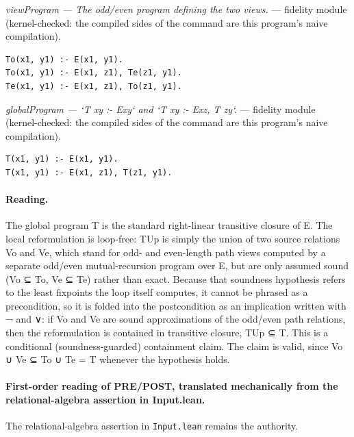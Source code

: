 \documentclass[10pt]{article}
\begin{document}
{\raggedright\textit{viewProgram --- The odd/even program defining the two views.} --- fidelity module (kernel-checked: the compiled sides of the command are this program's naive compilation).\par}

\begin{Verbatim}[fontsize=\scriptsize,breaklines=true,breakanywhere=true,frame=single,framesep=1.5mm]
To(x1, y1) :- E(x1, y1).
To(x1, y1) :- E(x1, z1), Te(z1, y1).
Te(x1, y1) :- E(x1, z1), To(z1, y1).
\end{Verbatim}

{\raggedright\textit{globalProgram --- `T xy :- Exy` and `T xy :- Exz, T zy`.} --- fidelity module (kernel-checked: the compiled sides of the command are this program's naive compilation).\par}

\begin{Verbatim}[fontsize=\scriptsize,breaklines=true,breakanywhere=true,frame=single,framesep=1.5mm]
T(x1, y1) :- E(x1, y1).
T(x1, y1) :- E(x1, z1), T(z1, y1).
\end{Verbatim}

\paragraph{Reading.} The global program T is the standard right-linear transitive closure of E. The local reformulation is loop-free: TUp is simply the union of two source relations Vo and Ve, which stand for odd- and even-length path views computed by a separate odd/even mutual-recursion program over E, but are only assumed sound (Vo ⊆ To, Ve ⊆ Te) rather than exact. Because that soundness hypothesis refers to the least fixpoints the loop itself computes, it cannot be phrased as a precondition, so it is folded into the postcondition as an implication written with ¬ and ∨: if Vo and Ve are sound approximations of the odd/even path relations, then the reformulation is contained in transitive closure, TUp ⊆ T. This is a conditional (soundness-guarded) containment claim. The claim is valid, since Vo ∪ Ve ⊆ To ∪ Te = T whenever the hypothesis holds.

\paragraph{First-order reading of PRE/POST, translated mechanically from the relational-algebra assertion in Input.lean.} The relational-algebra assertion in \texttt{Input.lean} remains the authority.
\end{document}
